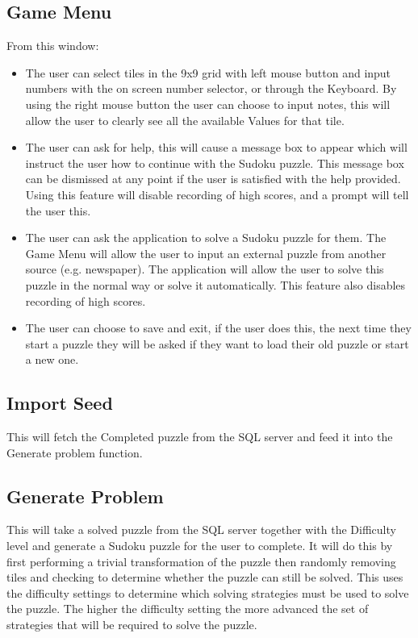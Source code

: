 \documentclass[fleqn]{article}
\begin{document}
\subsection{Game Menu}
From this window:
\begin{itemize}
\item The user can select tiles in the 9x9 grid with left mouse button and input numbers with the on screen number selector, or through the Keyboard. By using the right mouse button the user can choose to input notes, this will allow the user to clearly see all the available Values for that tile.
\item The user can ask for help, this will cause a message box to appear which will instruct the user how to continue with the Sudoku puzzle. This message box can be dismissed at any point if the user is satisfied with the help provided. Using this feature will disable recording of high scores, and a prompt will tell the user this.
\item The user can ask the application to solve a Sudoku puzzle for them. The Game Menu will allow the user to input an external puzzle from another source (e.g. newspaper). The application will allow the user to solve this puzzle in the normal way or solve it automatically. This feature also disables recording of high scores.
\item The user can choose to save and exit, if the user does this, the next time they start a puzzle they will be asked if they want to load their old puzzle or start a new one.
\end{itemize}

\subsection{Import Seed}
This will fetch the Completed puzzle from the SQL server and feed it into the Generate problem function.


\subsection{Generate Problem}
This will take a solved puzzle from the SQL server together with the Difficulty level and generate a Sudoku puzzle for the user to complete. It will do this by first performing a trivial transformation of the puzzle then randomly removing tiles and checking to determine whether the puzzle can still be solved. This uses the difficulty settings to determine which solving strategies must be used to solve the puzzle. The higher the difficulty setting the more advanced the set of strategies that will be required to solve the puzzle.
\end{document}
